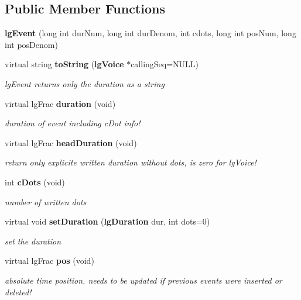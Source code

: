 \subsection*{Public Member Functions}
\begin{CompactItemize}
\item 
{\bf lg\-Event} (long int dur\-Num, long int dur\-Denom, int cdots, long int pos\-Num, long int pos\-Denom)
\item 
virtual string {\bf to\-String} ({\bf lg\-Voice} $\ast$calling\-Seq=NULL)
\begin{CompactList}\small\item\em lg\-Event returns only the duration as a string \item\end{CompactList}\item 
virtual lg\-Frac {\bf duration} (void)
\begin{CompactList}\small\item\em duration of event including c\-Dot info! \item\end{CompactList}\item 
virtual lg\-Frac {\bf head\-Duration} (void)
\begin{CompactList}\small\item\em return only explicite written duration without dots, is zero for lg\-Voice! \item\end{CompactList}\item 
int {\bf c\-Dots} (void)
\begin{CompactList}\small\item\em number of written dots \item\end{CompactList}\item 
virtual void {\bf set\-Duration} ({\bf lg\-Duration} dur, int dots=0)
\begin{CompactList}\small\item\em set the duration \item\end{CompactList}\item 
virtual lg\-Frac {\bf pos} (void)
\begin{CompactList}\small\item\em absolute time position. needs to be updated if previous events were inserted or deleted! \item\end{CompactList}\item 

\end{CompactItemize}
